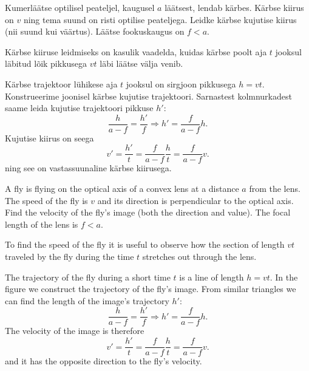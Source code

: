 
Kumerläätse optilisel peateljel, kaugusel $a$ läätsest, lendab kärbes.
Kärbse kiirus on $v$ ning tema suund on risti optilise peateljega.
Leidke kärbse kujutise kiirus (nii suund kui väärtus). Läätse
fookuskaugus on $f < a$.

\hint
Kärbse kiiruse leidmiseks on kasulik vaadelda, kuidas kärbse poolt aja $t$ jooksul läbitud lõik pikkusega $vt$ läbi läätse välja venib.

\solu
Kärbse trajektoor lühikese aja $t$ jooksul on sirgjoon pikkusega $h=vt$. Konstrueerime joonisel kärbse kujutise trajektoori. Sarnastest kolmnurkadest saame leida kujutise trajektoori pikkuse $h'$:
$$\frac{h}{a-f}=\frac{h'}{f} \Rightarrow h'=\frac{f}{a-f} h.$$
Kujutise kiirus on seega
$$v' = \frac{h'}{t} = \frac{f}{a-f} \frac{h}{t} = \frac{f}{a-f} v. $$
ning see on vastassuunaline kärbse kiirusega.

A fly is flying on the optical axis of a convex lens at a distance $a$ from the lens. The speed of the fly is $v$ and its direction is perpendicular to the optical axis. Find the velocity of the fly’s image (both the direction and value). The focal length of the lens is $f < a$.

\hinteng
To find the speed of the fly it is useful to observe how the section of length $vt$ traveled by the fly during the time $t$ stretches out through the lens.

\solueng
The trajectory of the fly during a short time $t$ is a line of length $h=vt$. In the figure we construct the trajectory of the fly’s image. From similar triangles we can find the length of the image’s trajectory $h'$:
$$\frac{h}{a-f}=\frac{h'}{f} \Rightarrow h'=\frac{f}{a-f} h.$$ 
The velocity of the image is therefore
$$v' = \frac{h'}{t} = \frac{f}{a-f} \frac{h}{t} = \frac{f}{a-f} v. $$ 
and it has the opposite direction to the fly’s velocity.
\probend